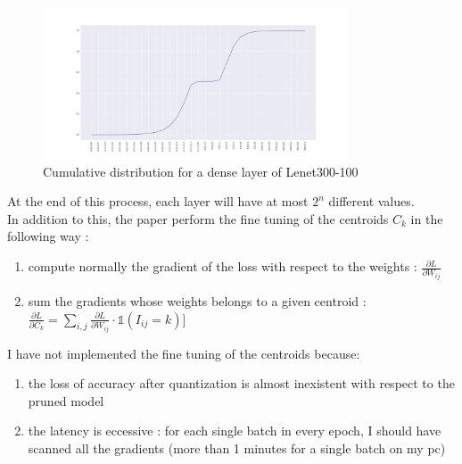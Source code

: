 \documentclass[journal]{vgtc}                %
\begin{document}
\begin{figure}[H]
	\includegraphics[width=90mm,scale=0.7]{cdf}
	\caption{Cumulative distribution for a dense layer of Lenet300-100 }
\end{figure}

At the end of this process, each layer will have at most $2^{n}$ different values.\\In addition to this, the paper perform the fine tuning of the centroids $C_k$ in the following way :
\begin{enumerate}
\item compute normally the gradient of the loss with respect to the weights : $\frac{\partial L}{\partial W_{ij}}$
\item sum the gradients whose weights belongs to a given centroid : $\frac{\partial L}{\partial C_{k}}=\sum\limits_{i,j}\frac{\partial L }{\partial W_{ij}}\cdot \mathbb{1}(I_{ij}=k) ]$
\end{enumerate}
I have not implemented the fine tuning of the centroids because:
\begin{enumerate}
\item the loss of accuracy after quantization is almost inexistent with respect to the pruned model
\item the latency is eccessive : for each single batch in every epoch, I should have scanned all the gradients (more than 1 minutes for a single batch on my pc) 
\end{enumerate}
\end{document}
